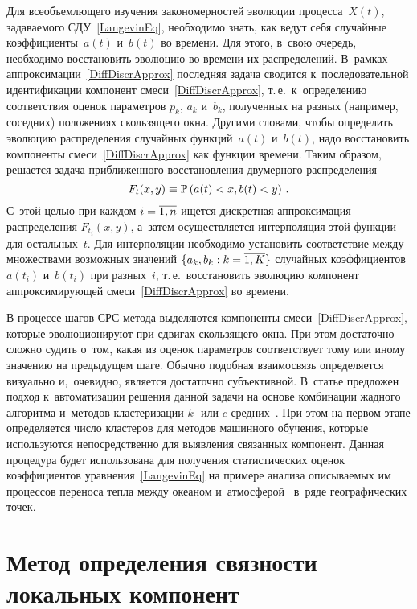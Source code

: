 \begin{multicols}{2}
Для всеобъемлющего изучения закономерностей эволюции процесса~$X(t)$, 
задаваемого СДУ~\eqref{LangevinEq}, необходимо знать, как ведут 
себя случайные коэффициенты~$a(t)$ и~$b(t)$ во времени. 
Для этого, в~свою очередь, необходимо восстановить эволюцию 
во времени их распределений. В~рамках аппроксимации~\eqref{DiffDiscrApprox}
 по\-след\-няя задача сводится к~последовательной идентификации компонент 
 смеси~\eqref{DiffDiscrApprox}, т.\,е.\ к~определению соответствия 
 оценок параметров $p_k$, $a_k$ и~$b_k$, полученных на разных (например, 
 соседних) положениях сколь\-зя\-ще\-го окна. Другими словами, чтобы 
 определить эволюцию распределения случайных функций~$a(t)$ и~$b(t)$, 
 надо восстановить компоненты смеси~\eqref{DiffDiscrApprox} как 
 функции времени. 
 Таким образом, решается задача при\-бли\-жен\-но\-го 
 восстановления двумерного распределения 
 $$F_t(x,y)\hm\equiv 
 \mathbb{P}\left(a(t)<x,b(t)<y\right)\,.$$ 
 С~этой целью при каждом 
 $i\hm=\overline{1,n}$ ищется дискретная аппроксимация распределения 
 $F_{t_i}(x,y)$, а~затем осуществляется интерполяция этой функции для 
 остальных~$t$. Для интерполяции необходимо установить соответствие 
 между множествами возможных значений $\{a_k,b_k: k\hm=\overline{1,K}\}$ 
 случайных коэффициентов $a(t_i)$ и~$b(t_i)$ при разных~$i$, т.\,е.\
  восстановить эволюцию компонент аппроксимиру\-ющей 
  смеси~\eqref{DiffDiscrApprox} во времени.

В процессе шагов СРС-метода выделяются компоненты 
смеси~\eqref{DiffDiscrApprox}, которые эволюционируют 
при сдвигах скользящего окна. При этом достаточно слож\-но 
судить о~том, какая из оценок па\-ра\-мет\-ров соответствует тому 
или иному значению на предыдущем шаге. Обычно по\-доб\-ная взаимосвязь 
определяется визуально и,~очевидно, является достаточно субъективной.
 В~статье предложен подход к~автоматизации решения данной задачи на 
 основе комбинации жад\-но\-го алгоритма и~методов клас\-те\-ри\-за\-ции $k$- 
 или $c$-сред\-них~\cite{Steinhaus1956,MacQueen1967,David2007,Dunn1973}. 
 При этом на первом этапе определяется чис\-ло клас\-те\-ров для методов 
 машинного обучения, которые используются непосредственно для вы\-яв\-ле\-ния 
 связанных компонент. Данная процедура будет использована для получения 
 статистических оценок коэффициентов урав\-не\-ния~\eqref{LangevinEq} 
 на примере анализа опи\-сы\-ва\-емых им процессов переноса теп\-ла 
 между океаном и~атмосферой~\cite{Belyaev2018} в~ряде географических точек.

\section{Метод определения связности локальных компонент}


\end{multicols}
